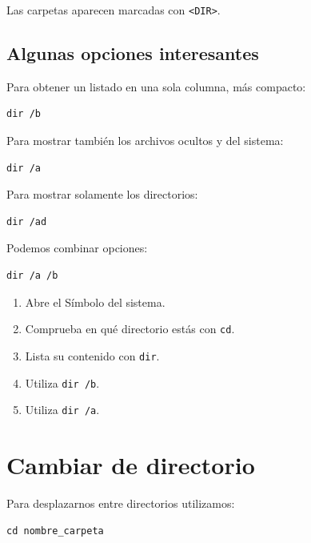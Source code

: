 \documentclass[11pt,a4paper]{article}
\begin{document}
\noindent Las carpetas aparecen marcadas con \texttt{<DIR>}.

\subsection{Algunas opciones interesantes}

Para obtener un listado en una sola columna, más compacto:

\begin{lstlisting}
dir /b
\end{lstlisting}

\noindent Para mostrar también los archivos ocultos y del sistema:

\begin{lstlisting}
dir /a
\end{lstlisting}

\noindent Para mostrar solamente los directorios:

\begin{lstlisting}
dir /ad
\end{lstlisting}

\noindent Podemos combinar opciones:

\begin{lstlisting}
dir /a /b
\end{lstlisting}

\begin{ejercicio}
\begin{enumerate}
    \item Abre el Símbolo del sistema.
    \item Comprueba en qué directorio estás con \texttt{cd}.
    \item Lista su contenido con \texttt{dir}.
    \item Utiliza \texttt{dir /b}.
    \item Utiliza \texttt{dir /a}.
\end{enumerate}
\end{ejercicio}

\section{Cambiar de directorio}

Para desplazarnos entre directorios utilizamos:

\begin{lstlisting}
cd nombre_carpeta
\end{lstlisting}
\end{document}
